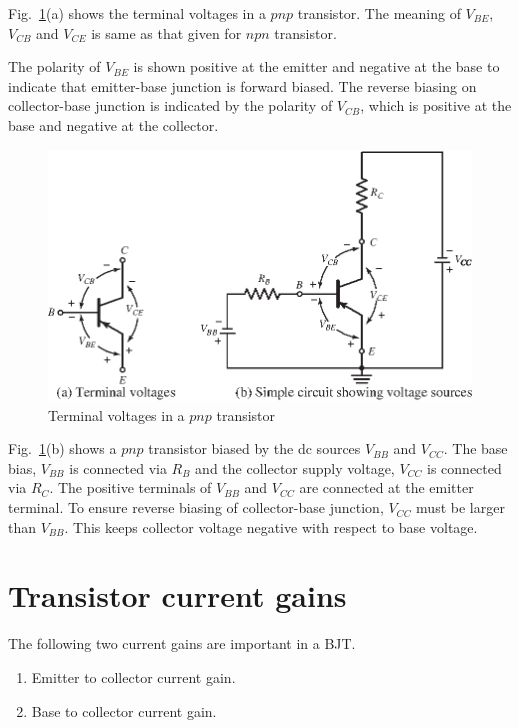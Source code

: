 Fig.~\ref{fig3.11}(a) shows the terminal voltages in a $pnp$ transistor. The meaning of $V_{BE}$, $V_{CB}$ and $V_{CE}$ is same as that given for $npn$ transistor.

The polarity of $V_{BE}$ is shown positive at the emitter and negative at the base to indicate that emitter-base junction is forward biased. The reverse biasing on collector-base junction is indicated by the polarity of $V_{CB}$, which is positive at the base and negative at the collector.
\begin{figure}[H]
\centering
\includegraphics{chap2/S3-EE-03-008.eps}
\caption{Terminal voltages in a $pnp$ transistor}\label{fig3.11}
\end{figure}

Fig.~\ref{fig3.11}(b) shows a $pnp$ transistor biased by the dc sources $V_{BB}$ and $V_{CC}$. The base bias, $V_{BB}$ is connected via $R_{B}$ and the collector supply voltage, $V_{CC}$ is connected via $R_{C}$. The positive terminals of $V_{BB}$ and $V_{CC}$ are connected at the emitter terminal. To ensure reverse biasing of collector-base junction, $V_{CC}$ must be larger than $V_{BB}$. This keeps collector voltage negative with respect to base voltage.

\section{Transistor current gains}\label{sec3.8}

The following two current gains are important in a BJT.
\begin{enumerate}
\item Emitter to collector current gain.

\item Base to collector current gain.
\end{enumerate}

